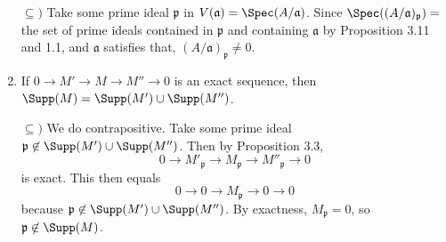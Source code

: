 \documentclass[a4paper]{exam}
\begin{document}
\begin{questions}
\begin{enumerate}
\begin{solution}
		$\subseteq) $ Take some prime ideal $\mathfrak{p} $ in $V(\mathfrak{a}) = \Spec(A / \mathfrak{a}) $.
		Since $\Spec((A / \mathfrak{a})_{\mathfrak{p}}) = $ the set of prime ideals contained in $\mathfrak{p} $ and containing $\mathfrak{a} $ by Proposition 3.11 and 1.1, and $\mathfrak{a} $ satisfies that, $(A / \mathfrak{a})_{\mathfrak{p}}\ne 0 $.
	\end{solution}
	\item If $0 \to M' \to M \to M'' \to 0 $ is an exact sequence, then $\Supp(M) = \Supp(M') \cup \Supp(M'') $.
	\begin{solution}
		$\subseteq) $ We do contrapositive.
		Take some prime ideal $\mathfrak{p} \not\in \Supp(M') \cup \Supp(M'') $.
		Then by Proposition 3.3,
		\[
			0 \to M'_{\mathfrak{p}} \to M_{\mathfrak{p}} \to M''_{\mathfrak{p}} \to 0
		\] 
		is exact.
		This then equals
		\[
			0 \to 0 \to M_{\mathfrak{p}} \to 0 \to 0
		\] 
		because $\mathfrak{p}\not\in \Supp(M') \cup \Supp(M'') $.
		By exactness, $M_{\mathfrak{p}} =0 $, so $\mathfrak{p} \not\in \Supp(M)$.


\end{solution}
\end{enumerate}
\end{questions}
\end{document}

